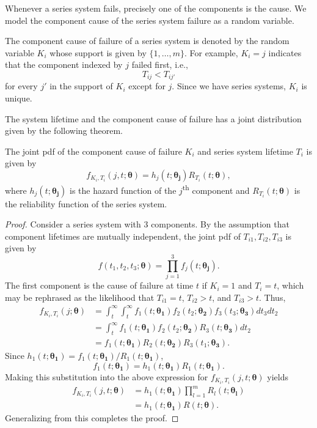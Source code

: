 \documentclass[
]{article}
\begin{document}
Whenever a series system fails, precisely one of the components is the
cause. We model the component cause of the series system failure as a
random variable.

\begin{definition}
The component cause of failure of a series system is
denoted by the random variable $K_i$ whose support is given by $\{1,\ldots,m\}$.
For example, $K_i=j$ indicates that the component indexed by $j$ failed first, i.e.,
$$
    T_{i j} < T_{i j'}
$$
for every $j'$ in the support of $K_i$ except for $j$.
Since we have series systems, $K_i$ is unique.
\end{definition}

The system lifetime and the component cause of failure has a joint
distribution given by the following theorem.

\begin{theorem}
\label{thm:f_k_and_t}
The joint pdf of the component cause of failure $K_i$ and series system lifetime
$T_i$ is given by
\begin{equation}
\label{eq:f_k_and_t}
  f_{K_i,T_i}(j,t;\boldsymbol{\theta}) = h_j(t;\boldsymbol{\theta_j}) R_{T_i}(t;\boldsymbol{\theta}),
\end{equation}
where $h_j(t;\boldsymbol{\theta_j})$ is the hazard function of the $j$\textsuperscript{th}
component and $R_{T_i}(t;\boldsymbol{\theta})$ is the reliability function of the series
system.
\end{theorem}
\begin{proof}
Consider a series system with $3$ components.
By the assumption that component lifetimes are mutually independent,
the joint pdf of $T_{i 1},T_{i 2},T_{i 3}$ is given by
$$
    f(t_1,t_2,t_3;\boldsymbol{\theta}) = \prod_{j=1}^{3} f_j(t;\boldsymbol{\theta_j}).
$$
The first component is the cause of failure at time $t$ if $K_i = 1$ and
$T_i = t$, which may be rephrased as the likelihood that $T_{i 1} = t$,
$T_{i 2} > t$, and $T_{i 3} > t$. Thus,
\begin{align*}
f_{K_i,T_i}(j;\boldsymbol{\theta}) 
    &= \int_t^{\infty} \int_t^{\infty}
        f_1(t;\boldsymbol{\theta_1}) f_2(t_2;\boldsymbol{\theta_2}) f_3(t_3;\boldsymbol{\theta_3})
        dt_3 dt_2\\
     &= \int_t^{\infty} f_1(t;\boldsymbol{\theta_1}) f_2(t_2;\boldsymbol{\theta_2})
        R_3(t;\boldsymbol{\theta_3}) dt_2\\
     &= f_1(t;\boldsymbol{\theta_1}) R_2(t;\boldsymbol{\theta_2}) R_3(t_1;\boldsymbol{\theta_3}).
\end{align*}
Since $h_1(t;\boldsymbol{\theta_1}) = f_1(t;\boldsymbol{\theta_1}) / R_1(t;\boldsymbol{\theta_1})$,
$$
f_1(t;\boldsymbol{\theta_1}) = h_1(t;\boldsymbol{\theta_1}) R_1(t;\boldsymbol{\theta_1}).
$$
Making this substitution into the above expression for $f_{K_i,T_i}(j,t;\boldsymbol{\theta})$
yields
\begin{align*}
f_{K_i,T_i}(j,t;\boldsymbol{\theta})
    &= h_1(t;\boldsymbol{\theta_1}) \prod_{l=1}^m R_l(t;\boldsymbol{\theta_l})\\
    &= h_1(t;\boldsymbol{\theta_1}) R(t;\boldsymbol{\theta}).
\end{align*}
Generalizing from this completes the proof.
\end{proof}
\end{document}
